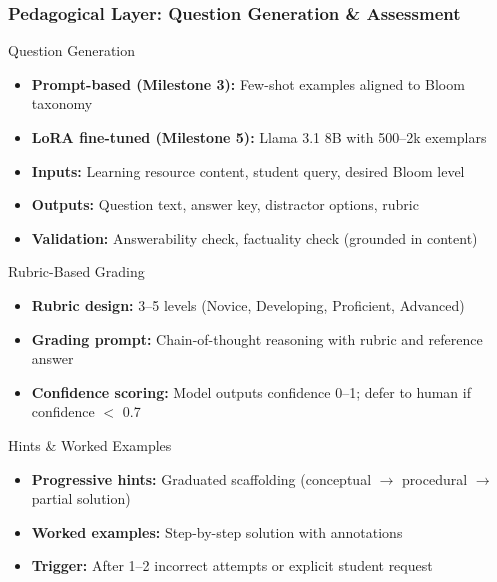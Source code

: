 \documentclass[aspectratio=169]{beamer}
\begin{document}
\begin{frame}
\frametitle{Pedagogical Layer: Question Generation \& Assessment}
\begin{block}{Question Generation}
\begin{itemize}
\item \textbf{Prompt-based (Milestone 3):} Few-shot examples aligned to Bloom taxonomy
\item \textbf{LoRA fine-tuned (Milestone 5):} Llama 3.1 8B with 500--2k exemplars
\item \textbf{Inputs:} Learning resource content, student query, desired Bloom level
\item \textbf{Outputs:} Question text, answer key, distractor options, rubric
\item \textbf{Validation:} Answerability check, factuality check (grounded in content)
\end{itemize}
\end{block}

\begin{block}{Rubric-Based Grading}
\begin{itemize}
\item \textbf{Rubric design:} 3--5 levels (Novice, Developing, Proficient, Advanced)
\item \textbf{Grading prompt:} Chain-of-thought reasoning with rubric and reference answer
\item \textbf{Confidence scoring:} Model outputs confidence 0--1; defer to human if confidence $<$ 0.7
\end{itemize}
\end{block}

\begin{block}{Hints \& Worked Examples}
\begin{itemize}
\item \textbf{Progressive hints:} Graduated scaffolding (conceptual $\rightarrow$ procedural $\rightarrow$ partial solution)
\item \textbf{Worked examples:} Step-by-step solution with annotations
\item \textbf{Trigger:} After 1--2 incorrect attempts or explicit student request
\end{itemize}
\end{block}
\end{frame}
\end{document}

